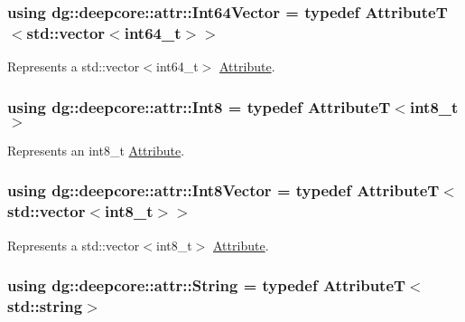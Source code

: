\subsubsection[{\texorpdfstring{Int64\+Vector}{Int64Vector}}]{\setlength{\rightskip}{0pt plus 5cm}using {\bf dg\+::deepcore\+::attr\+::\+Int64\+Vector} = typedef AttributeT$<$std\+::vector$<$int64\+\_\+t$>$$>$}\hypertarget{group___process_attributes_gaef3a74f1d9d18b13bc1fac094487f68a}{}\label{group___process_attributes_gaef3a74f1d9d18b13bc1fac094487f68a}


Represents a {\ttfamily std\+::vector$<$int64\+\_\+t$>$} \hyperlink{classdg_1_1deepcore_1_1_attribute}{Attribute}. 

\subsubsection[{\texorpdfstring{Int8}{Int8}}]{\setlength{\rightskip}{0pt plus 5cm}using {\bf dg\+::deepcore\+::attr\+::\+Int8} = typedef AttributeT$<$int8\+\_\+t$>$}\hypertarget{group___process_attributes_ga2024098683e1d9f9139de3e51952ea59}{}\label{group___process_attributes_ga2024098683e1d9f9139de3e51952ea59}


Represents an {\ttfamily int8\+\_\+t} \hyperlink{classdg_1_1deepcore_1_1_attribute}{Attribute}. 

\subsubsection[{\texorpdfstring{Int8\+Vector}{Int8Vector}}]{\setlength{\rightskip}{0pt plus 5cm}using {\bf dg\+::deepcore\+::attr\+::\+Int8\+Vector} = typedef AttributeT$<$std\+::vector$<$int8\+\_\+t$>$$>$}\hypertarget{group___process_attributes_gae5a53dc88f8ef5cc357df096aa806ca4}{}\label{group___process_attributes_gae5a53dc88f8ef5cc357df096aa806ca4}


Represents a {\ttfamily std\+::vector$<$int8\+\_\+t$>$} \hyperlink{classdg_1_1deepcore_1_1_attribute}{Attribute}. 

\subsubsection[{\texorpdfstring{String}{String}}]{\setlength{\rightskip}{0pt plus 5cm}using {\bf dg\+::deepcore\+::attr\+::\+String} = typedef AttributeT$<$std\+::string$>$}\hypertarget{group___process_attributes_ga84ae1d49f195126fef6224ad5817201e}{}\label{group___process_attributes_ga84ae1d49f195126fef6224ad5817201e}


